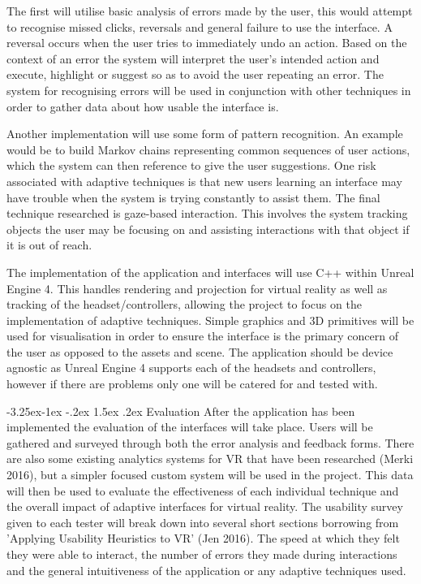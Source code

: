 \documentclass[12pt]{article}
\makeatletter
\renewcommand{\subsection}{\@startsection{subsection}{2}{\z@}%
             {-3.25ex\@plus -1ex \@minus -.2ex}%
             {1.5ex \@plus .2ex}%
             {\normalfont\large\scshape\bfseries}}
\makeatother
\begin{document}
The first will utilise basic analysis of errors made by the user, this would attempt to recognise missed clicks, reversals and general failure to use the interface. A reversal occurs when the user tries to immediately undo an action. Based on the context of an error the system will interpret the user's intended action and execute, highlight or suggest so as to avoid the user repeating an error. The system for recognising errors will be used in conjunction with other techniques in order to gather data about how usable the interface is.

Another implementation will use some form of pattern recognition. An example would be to build Markov chains representing common sequences of user actions, which the system can then reference to give the user suggestions. One risk associated with adaptive techniques is that new users learning an interface may have trouble when the system is trying constantly to assist them. The final technique researched is gaze-based interaction. This involves the system tracking objects the user may be focusing on and assisting interactions with that object if it is out of reach.

The implementation of the application and interfaces will use C++ within Unreal Engine 4. This handles rendering and projection for virtual reality as well as tracking of the headset/controllers, allowing the project to focus on the implementation of adaptive techniques. Simple graphics and 3D primitives will be used for visualisation in order to ensure the interface is the primary concern of the user as opposed to the assets and scene. The application should be device agnostic as Unreal Engine 4 supports each of the headsets and controllers, however if there are problems only one will be catered for and tested with. 

\subsection{Evaluation}
After the application has been implemented the evaluation of the interfaces will take place. Users will be gathered and surveyed through both the error analysis and feedback forms. There are also some existing analytics systems for VR that have been researched (Merki 2016), but a simpler focused custom system will be used in the project. This data will then be used to evaluate the effectiveness of each individual technique and the overall impact of adaptive interfaces for virtual reality. The usability survey given to each tester will break down into several short sections borrowing from 'Applying Usability Heuristics to VR' (Jen 2016). The speed at which they felt they were able to interact, the number of errors they made during interactions and the general intuitiveness of the application or any adaptive techniques used.
\end{document}

